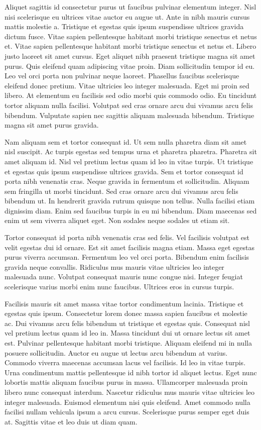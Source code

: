 \documentclass[11pt,a4paper]{article}
\begin{document}
Aliquet sagittis id consectetur purus ut faucibus pulvinar elementum integer. Nisl nisi scelerisque eu ultrices vitae auctor eu augue ut. Ante in nibh mauris cursus mattis molestie a. Tristique et egestas quis ipsum suspendisse ultrices gravida dictum fusce. Vitae sapien pellentesque habitant morbi tristique senectus et netus et. Vitae sapien pellentesque habitant morbi tristique senectus et netus et. Libero justo laoreet sit amet cursus. Eget aliquet nibh praesent tristique magna sit amet purus. Quis eleifend quam adipiscing vitae proin. Diam sollicitudin tempor id eu. Leo vel orci porta non pulvinar neque laoreet. Phasellus faucibus scelerisque eleifend donec pretium. Vitae ultricies leo integer malesuada. Eget mi proin sed libero. At elementum eu facilisis sed odio morbi quis commodo odio. Eu tincidunt tortor aliquam nulla facilisi. Volutpat sed cras ornare arcu dui vivamus arcu felis bibendum. Vulputate sapien nec sagittis aliquam malesuada bibendum. Tristique magna sit amet purus gravida.

Nam aliquam sem et tortor consequat id. Ut sem nulla pharetra diam sit amet nisl suscipit. Ac turpis egestas sed tempus urna et pharetra pharetra. Pharetra sit amet aliquam id. Nisl vel pretium lectus quam id leo in vitae turpis. Ut tristique et egestas quis ipsum suspendisse ultrices gravida. Sem et tortor consequat id porta nibh venenatis cras. Neque gravida in fermentum et sollicitudin. Aliquam sem fringilla ut morbi tincidunt. Sed cras ornare arcu dui vivamus arcu felis bibendum ut. In hendrerit gravida rutrum quisque non tellus. Nulla facilisi etiam dignissim diam. Enim sed faucibus turpis in eu mi bibendum. Diam maecenas sed enim ut sem viverra aliquet eget. Non sodales neque sodales ut etiam sit.

Tortor consequat id porta nibh venenatis cras sed felis. Vel facilisis volutpat est velit egestas dui id ornare. Est sit amet facilisis magna etiam. Massa eget egestas purus viverra accumsan. Fermentum leo vel orci porta. Bibendum enim facilisis gravida neque convallis. Ridiculus mus mauris vitae ultricies leo integer malesuada nunc. Volutpat consequat mauris nunc congue nisi. Integer feugiat scelerisque varius morbi enim nunc faucibus. Ultrices eros in cursus turpis.

Facilisis mauris sit amet massa vitae tortor condimentum lacinia. Tristique et egestas quis ipsum. Consectetur lorem donec massa sapien faucibus et molestie ac. Dui vivamus arcu felis bibendum ut tristique et egestas quis. Consequat nisl vel pretium lectus quam id leo in. Massa tincidunt dui ut ornare lectus sit amet est. Pulvinar pellentesque habitant morbi tristique. Aliquam eleifend mi in nulla posuere sollicitudin. Auctor eu augue ut lectus arcu bibendum at varius. Commodo viverra maecenas accumsan lacus vel facilisis. Id leo in vitae turpis. Urna condimentum mattis pellentesque id nibh tortor id aliquet lectus. Eget nunc lobortis mattis aliquam faucibus purus in massa. Ullamcorper malesuada proin libero nunc consequat interdum. Nascetur ridiculus mus mauris vitae ultricies leo integer malesuada. Euismod elementum nisi quis eleifend. Amet commodo nulla facilisi nullam vehicula ipsum a arcu cursus. Scelerisque purus semper eget duis at. Sagittis vitae et leo duis ut diam quam.
\end{document}
